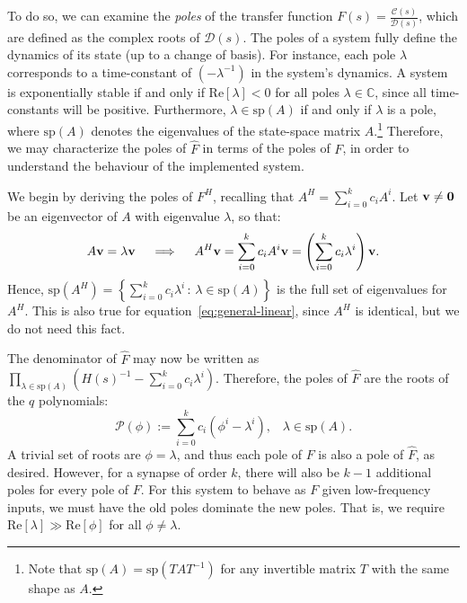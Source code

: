 To do so, we can examine the \emph{poles} of the transfer function $F(s) = \frac{\mathcal{C}(s)}{\mathcal{D}(s)}$, which are defined as the complex roots of $\mathcal{D}(s)$.
The poles of a system fully define the dynamics of its state (up to a change of basis).
For instance,
each pole $\lambda$ corresponds to a time-constant of $\left(-\lambda^{-1}\right)$ in the system's dynamics.
A system is exponentially stable if and only if $\text{Re} \left[ \lambda \right] < 0$ for all poles $\lambda \in \mathbb{C}$, since all time-constants will be positive.
Furthermore, $\lambda \in \text{sp}(A)$ if and only if $\lambda$ is a pole, where $\text{sp}(A)$ denotes the eigenvalues of the state-space matrix $A$.\footnote{%
Note that $\text{sp}(A) = \text{sp}(TAT^{-1})$ for any invertible matrix $T$ with the same shape as $A$.
}
Therefore, we may characterize the poles of $\hat{F}$ in terms of the poles of $F$, in order to understand the behaviour of the implemented system.

We begin by deriving the poles of $F^H$, recalling that $A^H = \sum_{i=0}^k c_i A^i$.
Let $\mathbf{v} \ne \mathbf{0}$ be an eigenvector of $A$ with eigenvalue $\lambda$, %
so that:
\begin{align*}
A\mathbf{v} = \lambda \mathbf{v} \quad \implies \quad A^H \mathbf{v} = \sum_{i=0}^k c_i A^i \mathbf{v} = \left( \sum_{i=0}^k c_i \lambda^i \right) \mathbf{v} \text{.}
\end{align*}
Hence, $\text{sp}\left(A^H \right) = \left\{  \sum_{i=0}^k c_i \lambda^i \,:\, \lambda \in \text{sp}(A) \right\}$ is the full set of eigenvalues for $A^H$.
This is also true for equation~\ref{eq:general-linear}, since $A^H$ is identical, but we do not need this fact.

The denominator of $\hat{F}$ may now be written as $\prod_{\lambda \in \text{sp}(A)} \left( H(s)^{-1} - \sum_{i=0}^k c_i \lambda^i \right)$.
Therefore, the poles of $\hat{F}$ are the roots of the $q$ polynomials:
\begin{equation*}
\mathcal{P}(\phi) := \sum_{i=0}^k c_i \left( \phi^i - \lambda^i \right) \text{,} \quad \lambda \in \text{sp}(A) \text{.}
\end{equation*}
A trivial set of roots are $\phi = \lambda$, and thus each pole of $F$ is also a pole of $\hat{F}$, as desired.
However, for a synapse of order $k$, there will also be $k - 1$ additional poles for every pole of $F$.
For this system to behave as $F$ given low-frequency inputs, we must have the old poles dominate the new poles.
That is, we require $\text{Re} \left[ \lambda \right] \gg \text{Re} \left[ \phi \right]$ for all $\phi \ne \lambda$.

